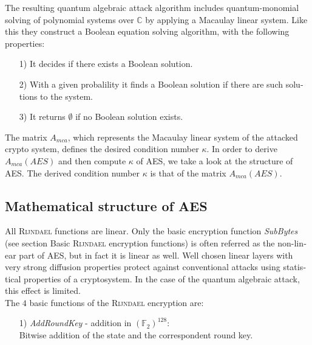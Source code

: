 \documentclass[a4paper,11pt]{article}
\begin{document}
\begin{otherlanguage}{english}
\noindent
The resulting quantum algebraic attack algorithm includes quantum-monomial solving of polynomial systems over $\mathbb{C}$ by applying a Macaulay linear system. Like this they construct a Boolean equation solving algorithm, with the following properties: \\

\begin{itemize} [noitemsep, nolistsep]
  \item[1)] It decides if there exists a Boolean solution.
  \vspace{0.1cm}
  \item[2)] With a given probalility it finds a Boolean solution if there are such solutions to the system.
  \vspace{0.1cm}
  \item[3)] It returns $\emptyset$ if no Boolean solution exists.
\end{itemize}
\vspace{0.5cm}

\noindent
The matrix $A_{mca}$, which represents the Macaulay linear system of the attacked crypto system, defines the desired condition number $\kappa$. In order to derive $A_{mca}(AES)$ and then compute $\kappa$ of \textsc{AES}, we take a look at the structure of \textsc{AES}. The derived condition number $\kappa$ is that of the matrix $A_{mca}(AES)$.


\subsection{Mathematical structure of \textsc{AES}}
\noindent
All \textsc{Rijndael} functions are linear. Only the basic encryption function \textit{SubBytes} (see section Basic \textsc{Rijndael} encryption functions) is often referred as the non-linear part of \textsc{AES}, but in fact it is linear as well. Well chosen linear layers with very strong diffusion properties protect against conventional attacks using statistical properties of a cryptosystem. In the case of the quantum algebraic attack, this effect is limited. \\


The $4$ basic functions of the \textsc{Rijndael} encryption are: \\

\begin{itemize} [noitemsep, nolistsep]
  \item[1)] \textit{AddRoundKey} - addition in ${(\mathbb{F}_2)}^{128}$: \\ 
  Bitwise addition of the state and the correspondent round key.
  \vspace{0.1cm}


\end{itemize}
\end{otherlanguage}
\end{document}
